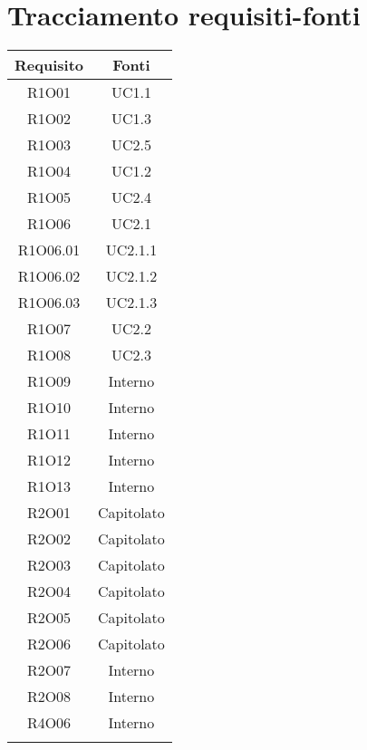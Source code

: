 \section{Tracciamento requisiti-fonti}
\begin{tabularx}{\textwidth}{|C|C|}
	\hline
	\textbf{Requisito} & \textbf{Fonti} \\
	\hline
	\endhead
	R1O01& UC1.1\\
	\hline
	R1O02& UC1.3\\
	\hline
	R1O03& UC2.5\\
	\hline
	R1O04& UC1.2\\
	\hline
	R1O05& UC2.4\\
	\hline
	R1O06& UC2.1\\
	\hline
	R1O06.01& UC2.1.1\\
	\hline
	R1O06.02& UC2.1.2\\
	\hline
	R1O06.03& UC2.1.3\\
	\hline
	R1O07& UC2.2\\
	\hline	
	R1O08& UC2.3\\
	\hline	
	R1O09& Interno\\
	\hline	
	R1O10& Interno\\
	\hline
	R1O11& Interno\\
	\hline	
	R1O12& Interno\\
	\hline
	R1O13& Interno\\
	\hline
	R2O01 &Capitolato\\
	\hline
	R2O02 &Capitolato\\
	\hline
	R2O03 &Capitolato\\
	\hline
	R2O04 &Capitolato\\
	\hline
	R2O05 &Capitolato\\
	\hline
	R2O06 &Capitolato\\
	\hline
	R2O07 &Interno\\
	\hline
	R2O08 &Interno\\
	\hline
	R4O06 &Interno\\
	\hline
	\caption{Tabella requisiti-fonti}
\end{tabularx}